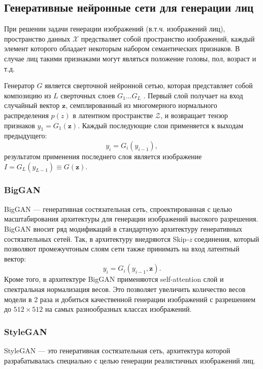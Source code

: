 \subsection{Генеративные нейронные сети для генерации лиц}

При решении задачи генерации изображений (в.т.ч. изображений лиц), пространство данных $\mathcal X$ предстваляет собой пространство изображений, каждый элемент которого обладает некоторым набором семантических признаков.
В случае лиц такими признаками могут являться положение головы, пол, возраст и т.д.

Генератор $G$ является сверточной нейронной сетью, которая представляет собой композицию из $L$ сверточных слоев $G_1 ... G_L$ . 
Первый слой получает на вход случайный вектор $\mathbf z$, семплированный из многомерного нормального распределения $p(z)$ в латентном пространстве $\mathcal Z$, и возвращает тензор признаков $y_1 = G_1(\mathbf z)$. 
Каждый последующие слои применяется к выходам предыдущего: 
$$ y_i = G_i(y_{i-1}), $$
результатом применения последнего слоя является изображение $I = G_L(y_{L-1}) \equiv G(\mathbf z)$.

\subsubsection{BigGAN}

BigGAN \cite{bigGAN} --- генеративная состязательная сеть, спроектированная с целью масштабирования архитектуры для генерации изображений высокого разрешения.
BigGAN вносит ряд модификаций в стандартную архитектуру генеративных состязательных сетей.
Так, в архитектуру внедряются Skip\emph{-z} соединения, который позволяют промежучтоным слоям сети также принимать на вход латентный вектор:
$$ y_i = G_i(y_{i-1}, \mathbf z). $$
Кроме того, в архитектуре BigGAN применяются self-attention слой и спектральная нормализация весов.
Это позволяет увеличить количество весов модели в 2 раза и добиться качественной генерации изображений с разрешением до $512\times512$ на самых разнообразных классах изображений.

\subsubsection{StyleGAN}
StyleGAN \cite{StyleGAN} --– это генеративная состязательная сеть, архитектура которой разрабатывалась специально с целью генерации реалистичных изображений лиц.

